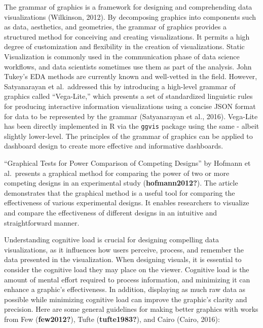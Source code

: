 \documentclass[print]{nuthesis}
\begin{document}
The grammar of graphics is a framework for designing and comprehending data visualizations (Wilkinson, 2012).
By decomposing graphics into components such as data, aesthetics, and geometries, the grammar of graphics provides a structured method for conceiving and creating visualizations.
It permits a high degree of customization and flexibility in the creation of visualizations.
Static Visualization is commonly used in the communication phase of data science workflows, and data scientists sometimes use them as part of the analysis.
John Tukey's EDA methods are currently known and well-vetted in the field.
However, Satyanarayan et al.~addressed this by introducing a high-level grammar of graphics called ``Vega-Lite,'' which presents a set of standardized linguistic rules for producing interactive information visualizations using a concise JSON format for data to be represented by the grammar (Satyanarayan et al., 2016).
Vega-Lite has been directly implemented in R via the \texttt{ggvis} package using the same - albeit slightly lower-level.
The principles of the grammar of graphics can be applied to dashboard design to create more effective and informative dashboards.

``Graphical Tests for Power Comparison of Competing Designs'' by Hofmann et al.~presents a graphical method for comparing the power of two or more competing designs in an experimental study (\textbf{hofmann2012?}).
The article demonstrates that the graphical method is a useful tool for comparing the effectiveness of various experimental designs.
It enables researchers to visualize and compare the effectiveness of different designs in an intuitive and straightforward manner.

Understanding cognitive load is crucial for designing compelling data visualizations, as it influences how users perceive, process, and remember the data presented in the visualization.
When designing visuals, it is essential to consider the cognitive load they may place on the viewer.
Cognitive load is the amount of mental effort required to process information, and minimizing it can enhance a graphic's effectiveness.
In addition, displaying as much raw data as possible while minimizing cognitive load can improve the graphic's clarity and precision.
Here are some general guidelines for making better graphics with works from Few (\textbf{few2012?}), Tufte (\textbf{tufte1983?}), and Cairo (Cairo, 2016):
\end{document}

